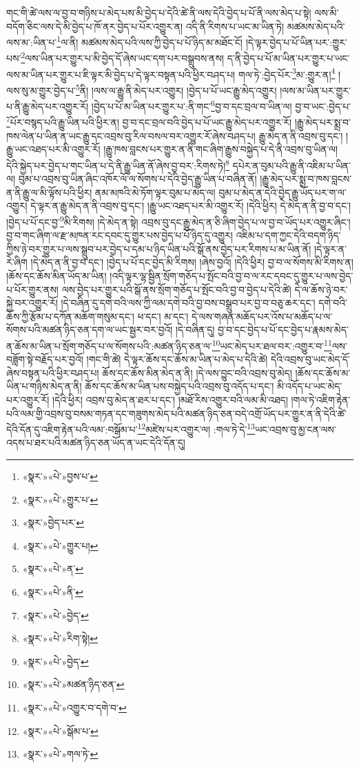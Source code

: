 གང་གི་ཚེ་ལས་ལ་བྱ་བ་གཉིས་པ་མེད་པས་མི་བྱེད་པ་དེའི་ཚེ་ནི་ལས་དེའི་བྱེད་པ་པོ་ནི་ལས་མེད་པ་སྟེ། ལས་མི་བདོག་ཅིང་ལས་དེ་མི་བྱེད་པ་ཁོ་ནར་བྱེད་པ་པོར་འགྱུར་ན། འདི་ནི་རིགས་པ་ཡང་མ་ཡིན་ཏེ། མཚམས་མེད་པའི་ལས་མ་:ཡིན་པ་\footnote{«སྣར་»«པེ་»བྱས་པ་}ལ་ནི། མཚམས་མེད་པའི་ལས་ཀྱི་བྱེད་པ་པོ་ཉིད་མ་མཐོང་ངོ། །དེ་ལྟར་བྱེད་པ་པོ་ཡིན་པར་:གྱུར་པས་\footnote{«སྣར་»«པེ་»གྱུར་པ་}ལས་ཡིན་པར་གྱུར་པ་མི་བྱེད་དོ་ཞེས་ཡང་དག་པར་བསྒྲུབས་ནས། ད་ནི་བྱེད་པ་པོ་མ་ཡིན་པར་གྱུར་པ་ཡང་ལས་མ་ཡིན་པར་གྱུར་པ་ཇི་ལྟར་མི་བྱེད་པ་དེ་ལྟར་བསྟན་པའི་ཕྱིར་བཤད་པ། གལ་ཏེ་:བྱེད་པོར་\footnote{«སྣར་»བྱེད་པར་}མ་:གྱུར་ན།\footnote{«སྣར་»«པེ་»གྱུར་པ།} །ལས་སུ་མ་གྱུར་བྱེད་པ་\footnote{«སྣར་»«པེ་»ན་}ནི། །ལས་ལ་རྒྱུ་ནི་མེད་པར་འགྱུར། །བྱེད་པ་པོ་ཡང་རྒྱུ་མེད་འགྱུར། །ལས་མ་ཡིན་པར་གྱུར་པ་ནི་རྒྱུ་མེད་པར་འགྱུར་རོ། །བྱེད་པ་པོ་མ་ཡིན་པར་གྱུར་པ་:ནི་གང་\footnote{«སྣར་»«པེ་»ནི་}བྱ་བ་དང་བྲལ་བ་ཡིན་ལ། བྱ་བ་ཡང་:བྱེད་པ་\footnote{«སྣར་»«པེ་»བྱེད་}པོར་བསྙད་པའི་རྒྱུ་ཡིན་པའི་ཕྱིར་ན། བྱ་བ་དང་བྲལ་བའི་བྱེད་པ་པོ་ཡང་རྒྱུ་མེད་པར་འགྱུར་རོ། །རྒྱུ་མེད་པར་སྨྲ་བ་ཁས་ལེན་པ་ཡིན་ན་ཡང་རྒྱུ་དང་འབྲས་བུ་རིལ་བསལ་བར་འགྱུར་རོ་ཞེས་བཤད་པ། རྒྱུ་མེད་ན་ནི་འབྲས་བུ་དང་། །རྒྱུ་ཡང་འཐད་པར་མི་འགྱུར་རོ། །རྒྱུ་ཁས་བླངས་པར་གྱུར་ན་ནི་གང་ཞིག་རྒྱུས་བསྐྱེད་པ་དེ་ནི་འབྲས་བུ་ཡིན་ལ། དེའི་སྐྱེད་པར་བྱེད་པ་གང་ཡིན་པ་དེ་ནི་རྒྱུ་ཡིན་ནོ་ཞེས་བྱ་བར་:རིགས་ཏེ།\footnote{«སྣར་»«པེ་»རིག་སྟེ།} དཔེར་ན་བུམ་པའི་རྒྱུ་ནི་འཇིམ་པ་ཡིན་ལ། བུམ་པ་འབྲས་བུ་ཡིན་ཞིང་འཁོར་ལོ་ལ་སོགས་པ་དེའི་བྱེད་རྒྱུ་ཡིན་པ་བཞིན་ནོ། །རྒྱུ་མེད་པར་སྨྲ་བ་ཁས་བླངས་ན་ནི་རྒྱུ་ལ་མི་ལྟོས་པའི་ཕྱིར། ནམ་མཁའི་མེ་ཏོག་ལྟར་བུམ་པ་མེད་ལ། བུམ་པ་མེད་ན་དེའི་བྱེད་རྒྱུ་ཡོད་པར་ག་ལ་འགྱུར། དེ་ལྟར་ན་རྒྱུ་མེད་ན་ནི་འབྲས་བུ་དང་། །རྒྱུ་ཡང་འཐད་པར་མི་འགྱུར་རོ། །དེའི་ཕྱིར། དེ་མེད་ན་ནི་བྱ་བ་དང་། །བྱེད་པ་པོ་དང་བྱ་\footnote{«སྣར་»«པེ་»བྱེད་}མི་རིགས། །དེ་མེད་ན་སྟེ། འབྲས་བུ་དང་རྒྱུ་མེད་ན་ཅི་ཞིག་བྱེད་པ་ལ་བྱ་བ་ཡོད་པར་འགྱུར་ཞིང་། བྱ་བ་གང་ཞིག་ལ་རྫ་མཁན་རང་དབང་དུ་གྱུར་པས་བྱེད་པ་པོ་ཉིད་དུ་འགྱུར། འཇིམ་པ་དག་ཀྱང་དེའི་བདག་ཉིད་ཀྱིས་ཉེ་བར་གྱུར་པ་ལས་སྒྲུབ་པར་བྱེད་པ་དམ་པ་ཉིད་ཡིན་པའི་སྒོ་ནས་བྱེད་པར་རིགས་པ་མ་ཡིན་ནོ། །དེ་ལྟར་ན་རེ་ཞིག །དེ་མེད་ན་ནི་བྱ་བ་དང་། །བྱེད་པ་པོ་དང་བྱེད་མི་རིགས། །ཞེས་བྱའོ། །དེའི་ཕྱིར། བྱ་བ་ལ་སོགས་མི་རིགས་ན། །ཆོས་དང་ཆོས་མིན་ཡོད་མ་ཡིན། །འདི་ལྟར་ལྷ་སྦྱིན་སྲོག་གཅོད་པ་སྤོང་བའི་བྱ་བ་ལ་རང་དབང་དུ་གྱུར་པ་ལས་བྱེད་པ་པོར་གྱུར་ནས། ལས་བྱེད་པར་གྱུར་པའི་སྒོ་ནས་སྲོག་གཅོད་པ་སྤོང་བའི་བྱ་བ་བྱེད་པ་དེའི་ཚེ། དེ་ལ་ཆོས་ཉེ་བར་སྐྱེ་བར་འགྱུར་རོ། །དེ་བཞིན་དུ་དགེ་བའི་ལས་ཀྱི་ལམ་དགེ་བའི་བྱ་བས་བསྒྲུབ་པར་བྱ་བ་བཅུ་ཆར་དང་། དགེ་བའི་ཆོས་ཀྱི་རྩོམ་པ་དཀོན་མཆོག་གསུམ་དང་། ཕ་དང་། མ་དང་། དེ་ལས་གཞན་མཆོད་པར་འོས་པ་མཆོད་པ་ལ་སོགས་པའི་མཚན་ཉིད་ཅན་དག་ལ་ཡང་སྦྱར་བར་བྱའོ། །དེ་བཞིན་དུ། བྱ་བ་དང་བྱེད་པ་པོ་དང་བྱེད་པ་རྣམས་མེད་ན་ཆོས་མ་ཡིན་པ་སྲོག་གཅོད་པ་ལ་སོགས་པའི་:མཚན་ཉིད་ཅན་ལ་\footnote{«སྣར་»«པེ་»མཚན་ཉིད་ཅན་}ཡང་མེད་པར་ཐལ་བར་:འགྱུར་བ་\footnote{«སྣར་»«པེ་»འགྱུར་བ་དགེ་བ་}ལས་བཟློག་སྟེ་བརྗོད་པར་བྱའོ། །གང་གི་ཚེ། དེ་ལྟར་ཆོས་དང་ཆོས་མ་ཡིན་པ་མེད་པ་དེའི་ཚེ། དེའི་འབྲས་བུ་ཡང་མེད་དོ་ཞེས་བསྟན་པའི་ཕྱིར་བཤད་པ། ཆོས་དང་ཆོས་མིན་མེད་ན་ནི། །དེ་ལས་བྱུང་བའི་འབྲས་བུ་མེད། །ཆོས་དང་ཆོས་མ་ཡིན་པ་གཉིས་མེད་ན་ནི། ཆོས་དང་ཆོས་མ་ཡིན་པས་བསྐྱེད་པའི་འབྲས་བུ་འདོད་པ་དང་། མི་འདོད་པ་ཡང་མེད་པར་འགྱུར་རོ། །དེའི་ཕྱིར། འབྲས་བུ་མེད་ན་ཐར་པ་དང་། །མཐོ་རིས་འགྱུར་བའི་ལམ་མི་འཐད། །གལ་ཏེ་འཇིག་རྟེན་པའི་ལམ་གྱི་འབྲས་བུ་བསམ་གཏན་དང་གཟུགས་མེད་པའི་མཚན་ཉིད་ཅན་བདེ་འགྲོ་ཡོད་པར་གྱུར་ན་ནི་དེའི་ཚེ་དེའི་དོན་དུ་འཇིག་རྟེན་པའི་ལམ་:བསྒོམ་པ་\footnote{«སྣར་»«པེ་»སྒོམ་པ་}མཛེས་པར་འགྱུར་ལ། :གལ་ཏེ་དེ་\footnote{«སྣར་»«པེ་»གལ་ཏེ་}ཡང་འབྲས་བུ་མྱ་ངན་ལས་འདས་པ་ཐར་པའི་མཚན་ཉིད་ཅན་ཡོད་ན་ཡང་དེའི་དོན་དུ། 